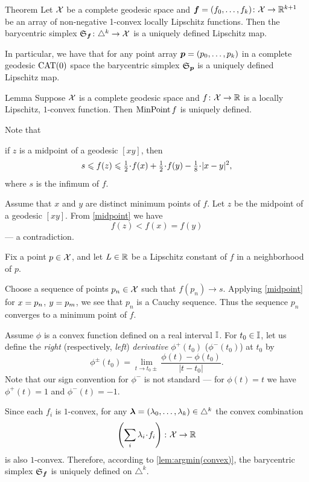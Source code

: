 \begin{thm}{Theorem}\label{thm:barycenter}
Let $\mathcal{X}$ be a complete geodesic space 
and $\bm{f}\z=(f_0,\z\ldots,f_k)\:\spc{X}\z\to\RR^{k+1}$
be an array of non-negative 1-convex locally Lipschitz functions.
Then the barycentric simplex 
$\mathfrak{S}_{\bm{f}}\colon\triangle^k\to \mathcal{X}$ is a uniquely defined Lipschitz map.

In particular, we have that for any point array $\bm{p}\z=(p_0,\z\ldots,p_k)$ in a complete geodesic $\mathrm{CAT}(0)$ space
the barycentric simplex $\mathfrak{S}_{\bm{p}}$ is a uniquely defined Lipschitz map.
\end{thm}


\begin{thm}{Lemma}\label{lem:argmin(convex)}
Suppose $\mathcal{X}$ is a complete geodesic space and $f\:\spc{X}\z\to\RR$ is a locally Lipschitz, $1$-convex function.
Then $\mathop{\rm MinPoint} f$ is uniquely defined.
\end{thm}

Note that
\begin{clm}{}\label{midpoint}
 if $z$ is a midpoint of a geodesic $[x y]$, then 
\[s\le f(z)
\le
\tfrac{1}{2}\cdot f(x)+\tfrac{1}{2}\cdot f(y)-\tfrac{1}{8}\cdot\dist[2]{x}{y}{},
\]
where $s$ is the infimum of $f$.
\end{clm}

Assume that $x$ and $y$ are distinct minimum points of $f$.
Let $z$ be the midpoint of a geodesic $[x y]$.
From \ref{midpoint} we have
\[f(z)<f(x)=f(y)\] 
--- a contradiction. 

Fix a point $p\in \mathcal{X}$, and
let $L\in\mathbb{R}$ be a Lipschitz constant of $f$ in a neighborhood of $p$.

Choose a sequence of points $p_n\in \mathcal{X}$ such that $f(p_n)\to s$.
Applying \ref{midpoint} for $x\z=p_n$, $y\z=p_m$, we see that $p_n$ is a Cauchy sequence.
Thus the sequence $p_n$ converges to a minimum point of $f$.
\qeds

Assume $\phi$ is a convex function defined on a real interval $\mathbb{I}$.
For $t_0\in\mathbb{I}$, let us define the \emph{right} (respectively, \emph{left}) \emph{derivative} $\phi^+(t_0)$ ($\phi^-(t_0)$) at $t_0$ by
\[\phi^\pm(t_0)=\lim_{t\to t_0\pm} \frac{\phi(t)-\phi(t_0)}{|t-t_0|}.\]
Note that our sign convention for $\phi^-$ is not standard --- for $\phi(t)=t$ we have
$\phi^+(t)=1$ and $\phi^-(t)=-1$.

Since each $f_i$ is $1$-convex, for any $\bm{\lambda}=(\lambda_0,\ldots,\lambda_k)\z\in\triangle^k$
the convex combination 
\[\left(\sum_i \lambda_i\cdot f_i\right)\:\spc{X}\to\RR\]
is also $1$-convex.
Therefore, according to \ref{lem:argmin(convex)}, the barycentric simplex 
$\mathfrak{S}_{\bm{f}}$ is uniquely defined on $\triangle^k$.
 
